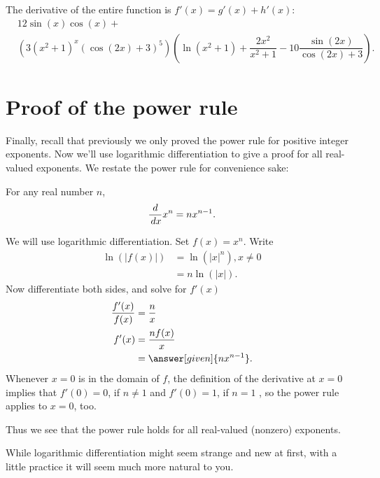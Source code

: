 \documentclass{ximera}
\begin{document}
\begin{example}
\begin{explanation}
		The derivative of the entire function is $f'(x) = g'(x) + h'(x)$:
		\begin{align*}
			&12\sin(x)\cos(x) + \\
			&\left(3(x^2+1)^x(\cos(2x) + 3)^5\right)\left(\ln(x^2+1) + \dfrac{2x^2}{x^2+1} -10 \dfrac{\sin(2x)}{\cos(2x)+3}\right). 
		\end{align*}
	\end{explanation}
	
\end{example}


\section{Proof of the power rule}


Finally, recall that previously we only proved the power rule for
positive integer exponents. Now we'll use logarithmic differentiation to give
a proof for all real-valued exponents. We restate the power rule
for convenience sake:

\begin{theorem}
	For any  real number $n$, 
	\[ \frac{d}{\,d x} x^n = n x^{n-1}. \]
	\begin{explanation}
	
		We will use logarithmic differentiation. Set $f(x) = x^n$. Write
		\begin{align*}
			\ln(|f(x)|) &= \ln\left(|x|^n\right) , x\ne0\\ 
				&= n\ln(|x|).
		\end{align*}
		Now differentiate both sides, and solve for $f'(x)$
		\begin{align*}
			\frac{f'(x)}{f(x)} &= \frac{n}{x}\\
				f'(x) &=\frac{n f(x)}{x}\\
				&= \answer[given]{n x^{n-1}}.
		\end{align*}
		Whenever $x=0$ is in the domain of $f$, the definition of the derivative at $x=0$ implies that  $f'(0)=0$, if $n\ne1$ and $f'(0)=1$, if $n=1$ , so the power rule applies to $x=0$, too.
		
		Thus we see that the power rule holds for all real-valued (nonzero) exponents.
	\end{explanation}
\end{theorem}

While logarithmic differentiation might seem strange and new at first, with a little practice it will seem much more natural to you.
\end{document}
